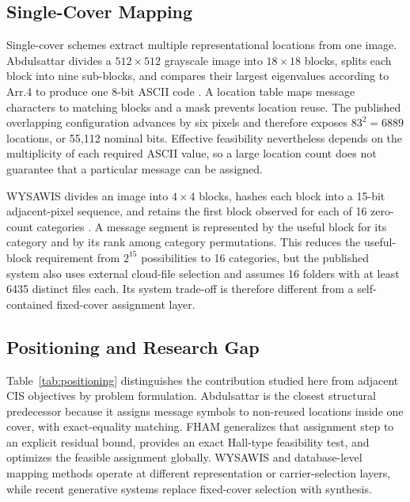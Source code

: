 \documentclass[preprint,12pt]{elsarticle}
\theoremstyle{plain}
\begin{document}
\subsection{Single-Cover Mapping}
Single-cover schemes extract multiple representational locations from one image. Abdulsattar divides a $512\times512$ grayscale image into $18\times18$ blocks, splits each block into nine sub-blocks, and compares their largest eigenvalues according to Arr.4 to produce one 8-bit ASCII code \cite{abdulsattar2021}. A location table maps message characters to matching blocks and a mask prevents location reuse. The published overlapping configuration advances by six pixels and therefore exposes $83^2=6889$ locations, or 55,112 nominal bits. Effective feasibility nevertheless depends on the multiplicity of each required ASCII value, so a large location count does not guarantee that a particular message can be assigned.

WYSAWIS divides an image into $4\times4$ blocks, hashes each block into a 15-bit adjacent-pixel sequence, and retains the first block observed for each of 16 zero-count categories \cite{wysawis2024}. A message segment is represented by the useful block for its category and by its rank among category permutations. This reduces the useful-block requirement from $2^{15}$ possibilities to 16 categories, but the published system also uses external cloud-file selection and assumes 16 folders with at least 6435 distinct files each. Its system trade-off is therefore different from a self-contained fixed-cover assignment layer.

\subsection{Positioning and Research Gap}
Table~\ref{tab:positioning} distinguishes the contribution studied here from adjacent CIS objectives by problem formulation. Abdulsattar is the closest structural predecessor because it assigns message symbols to non-reused locations inside one cover, with exact-equality matching. FHAM generalizes that assignment step to an explicit residual bound, provides an exact Hall-type feasibility test, and optimizes the feasible assignment globally. WYSAWIS and database-level mapping methods operate at different representation or carrier-selection layers, while recent generative systems replace fixed-cover selection with synthesis.
\end{document}
